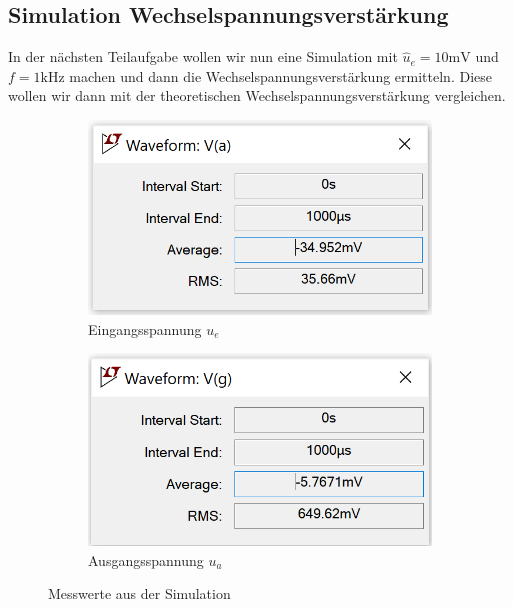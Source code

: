 \documentclass{article}
\begin{document}
\newpage
\subsection{Simulation Wechselspannungsverstärkung}

In der nächsten Teilaufgabe wollen wir nun eine Simulation mit $\hat{u}_{e} = 10\mathrm{mV}$ und $f = 1\mathrm{kHz}$ machen und dann die Wechselspannungsverstärkung ermitteln. Diese wollen wir dann mit der theoretischen Wechselspannungsverstärkung vergleichen.\\

\begin{figure}[h]
  \centering
  \begin{subfigure}[h]{0.3\textwidth}
    \includegraphics[width=\textwidth]{../assets/images/EL2P1/abb3.png}
    \caption{Eingangsspannung $u_{e}$}
  \end{subfigure}
  \hfill
  \begin{subfigure}[h]{0.3\textwidth}
    \includegraphics[width=\textwidth]{../assets/images/EL2P1/abb4.png}
    \caption{Ausgangsspannung $u_{a}$}
  \end{subfigure}
  \caption{Messwerte aus der Simulation}
  \label{fig:subfig1}
\end{figure}
\end{document}
